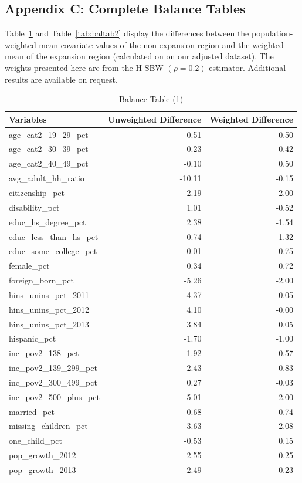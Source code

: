 \documentclass[12pt]{article}
\begin{document}
\subsection{Appendix C: Complete Balance Tables}

Table~\ref{tab:baltab1} and Table~\ref{tab:baltab2} display the differences between the population-weighted mean covariate values of the non-expansion region and the weighted mean of the expansion region (calculated on on our adjusted dataset). The weights presented here are from the H-SBW $(\rho = 0.2)$ estimator. Additional results are available on request.

\begin{table}[ht]
\begin{tabular}{lrr}
  \toprule
Variables & Unweighted Difference & Weighted Difference \\ 
  \midrule
age\_cat2\_19\_29\_pct & 0.51 & 0.50 \\ 
  age\_cat2\_30\_39\_pct & 0.23 & 0.42 \\ 
  age\_cat2\_40\_49\_pct & -0.10 & 0.50 \\ 
  avg\_adult\_hh\_ratio & -10.11 & -0.15 \\ 
  citizenship\_pct & 2.19 & 2.00 \\ 
  disability\_pct & 1.01 & -0.52 \\ 
  educ\_hs\_degree\_pct & 2.38 & -1.54 \\ 
  educ\_less\_than\_hs\_pct & 0.74 & -1.32 \\ 
  educ\_some\_college\_pct & -0.01 & -0.75 \\ 
  female\_pct & 0.34 & 0.72 \\ 
  foreign\_born\_pct & -5.26 & -2.00 \\ 
  hins\_unins\_pct\_2011 & 4.37 & -0.05 \\ 
  hins\_unins\_pct\_2012 & 4.10 & -0.00 \\ 
  hins\_unins\_pct\_2013 & 3.84 & 0.05 \\ 
  hispanic\_pct & -1.70 & -1.00 \\ 
  inc\_pov2\_138\_pct & 1.92 & -0.57 \\ 
  inc\_pov2\_139\_299\_pct & 2.43 & -0.83 \\ 
  inc\_pov2\_300\_499\_pct & 0.27 & -0.03 \\ 
  inc\_pov2\_500\_plus\_pct & -5.01 & 2.00 \\ 
  married\_pct & 0.68 & 0.74 \\ 
  missing\_children\_pct & 3.63 & 2.08 \\ 
  one\_child\_pct & -0.53 & 0.15 \\ 
  pop\_growth\_2012 & 2.55 & 0.25 \\ 
  pop\_growth\_2013 & 2.49 & -0.23 \\ 
   \bottomrule
    \end{tabular}
    \caption{Balance Table (1)}
    \label{tab:baltab1}
\end{table}
\end{document}
